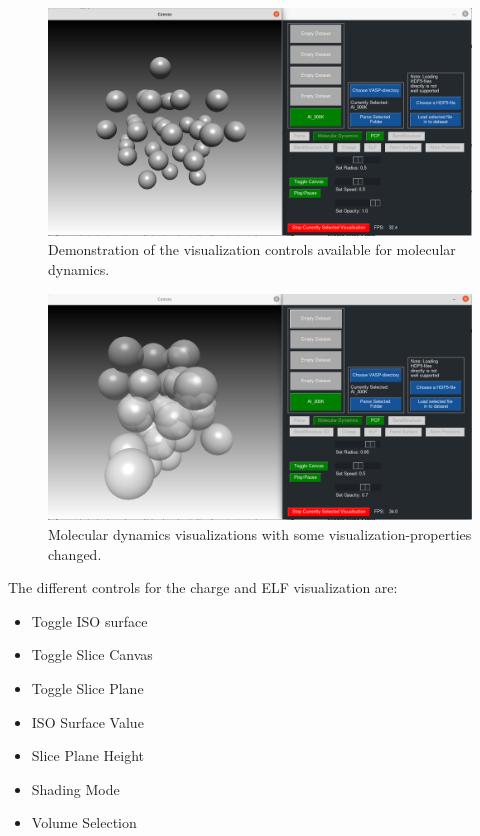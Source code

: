 \begin{figure}[H]
    \centering
    \includegraphics[scale = 0.40]{Images/newGUI_moldynSettings.png}
    \caption{Demonstration of the visualization controls available for molecular dynamics.}
    \label{fig:newGUI_moldynSettings}
\end{figure}

\begin{figure}[H]
    \centering
    \includegraphics[scale = 0.40]{Images/newGUI_moldynSettingsChanged.png}
    \caption{Molecular dynamics visualizations with some visualization-properties changed.}
    \label{fig:newGUI_moldynSettingsChanged}
\end{figure}

The different controls for the charge and ELF visualization are:
\begin{itemize}
  \item Toggle ISO surface
  \item Toggle Slice Canvas
  \item Toggle Slice Plane
  \item ISO Surface Value
  \item Slice Plane Height
  \item Shading Mode
  \item Volume Selection
\end{itemize}

